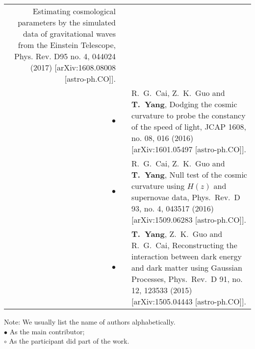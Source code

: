 \documentclass[letterpaper]{moderncv}  %
\begin{document}
{\begin{longtable}{rp{0.3cm}p{15.55cm}}
  Estimating cosmological parameters by the simulated data of gravitational waves from the Einstein Telescope,
  Phys. Rev. D95 no. 4, 044024 (2017)
  [arXiv:1608.08008 [astro-ph.CO]].
\vspace{0.05cm}\\
\textbf{$\bullet$} & &  R.~G.~Cai, Z.~K.~Guo and \textbf{T.~Yang},
  Dodging the cosmic curvature to probe the constancy of the speed of light,
  JCAP {1608}, no. 08, 016 (2016)
  [arXiv:1601.05497 [astro-ph.CO]].
\vspace{0.05cm}\\
\textbf{$\bullet$} & & R.~G.~Cai, Z.~K.~Guo and \textbf{T.~Yang},
  Null test of the cosmic curvature using $H(z)$ and supernovae data,
  Phys.\ Rev.\ D {93}, no. 4, 043517 (2016)
  [arXiv:1509.06283 [astro-ph.CO]].
\vspace{0.05cm}\\
\textbf{$\bullet$} & & \textbf{T.~Yang}, Z.~K.~Guo and R.~G.~Cai,
  Reconstructing the interaction between dark energy and dark matter using Gaussian Processes,
  Phys.\ Rev.\ D {91}, no. 12, 123533 (2015)
  [arXiv:1505.04443 [astro-ph.CO]].
\vspace{0.05cm}\\
\end{longtable}
}

Note: We usually list the name of authors alphabetically.\\
\textbf{$\bullet$} As the main contributor;\\
\textbf{$\circ$} As the participant did part of the work.



\end{document}

